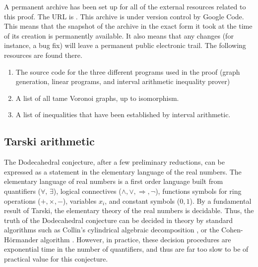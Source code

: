 A permanent archive has been set up for all of the external
resources related to this proof.  The URL is \cite{code}.
This archive is under version control by Google Code.  
This means that the snapshot of the archive in the
exact form it took at the time of its creation is permanently available.
It also means that any changes 
(for instance, a  bug fix) will leave
a permanent public electronic trail.
The following resources are found there.
\begin{enumerate}
\item The source code for the three different programs used in the proof (graph generation, linear programs, and interval arithmetic inequality prover)
\item A list of all tame Voronoi graphs, up to isomorphism.
\item A list of inequalities that have been established by interval arithmetic.
\end{enumerate}

\subsection{Tarski arithmetic}


The Dodecahedral conjecture, after a few preliminary reductions, 
can be expressed as a statement
in the elementary language of the real numbers.  The elementary
language of real numbers is a first order language built from
quantifiers ($\forall,\,\exists$), logical connectives ($\land,\lor,\Rightarrow,\neg$), functions symbols for ring operations ($+,\times,-$), variables $x_i$, 
and constant
symbols ($0,1$). By a fundamental
result of Tarski, the elementary theory of the real numbers
is decidable.  Thus, the
truth of the Dodecahedral 
conjecture can be decided in theory by standard
algorithms such as Collin's cylindrical algebraic decomposition \cite{Col}, or the Cohen-H\"ormander algorithm \cite{Hor}.  However,
in practice, these decision procedures are exponential time in the
number of quantifiers, and thus are far too slow to be of practical
value for this conjecture.

